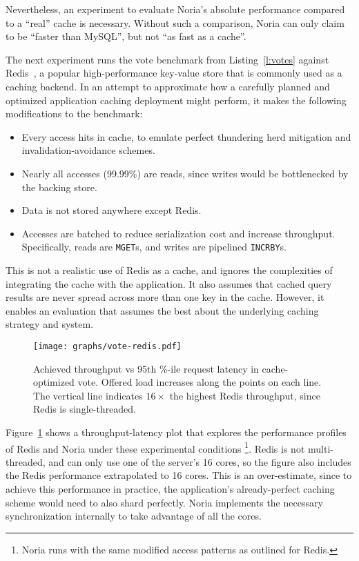 Nevertheless, an experiment to evaluate Noria's absolute performance compared to
a ``real'' cache is necessary. Without such a comparison, Noria can only claim
to be ``faster than MySQL'', but not ``as fast as a cache''.

The next experiment runs the vote benchmark from Listing~\ref{l:votes} against
Redis~\cite{redis}, a popular high-performance key-value store that is commonly
used as a caching backend. In an attempt to approximate how a carefully planned
and optimized application caching deployment might perform, it makes the
following modifications to the benchmark:

\begin{itemize}
 \item Every access hits in cache, to emulate perfect thundering herd mitigation
   and invalidation-avoidance schemes.
 \item Nearly all accesses (99.99\%) are reads, since writes would be
   bottlenecked by the backing store.
 \item Data is not stored anywhere except Redis.
 \item Accesses are batched to reduce serialization cost and increase
   throughput. Specifically, reads are \texttt{MGET}s, and writes are pipelined
    \texttt{INCRBY}s.
\end{itemize}

This is not a realistic use of Redis as a cache, and ignores the complexities of
integrating the cache with the application. It also assumes that cached query
results are never spread across more than one key in the cache. However, it
enables an evaluation that assumes the best about the underlying caching
strategy and system.

\begin{figure}[h]
  \centering
  \texttt{[image: graphs/vote-redis.pdf]}
  \caption{Achieved throughput vs 95th \%-ile request latency in cache-optimized
  vote. Offered load increases along the points on each line. The vertical
  line indicates $16\times$ the highest Redis throughput, since Redis is
  single-threaded.}
  \label{f:vote-redis}
\end{figure}

Figure~\ref{f:vote-redis} shows a throughput-latency plot that explores the
performance profiles of Redis and Noria under these experimental conditions%
\footnote{Noria runs with the same modified access patterns as outlined for
Redis.}.
Redis is not multi-threaded, and can only use one of the server's 16 cores, so
the figure also includes the Redis performance extrapolated to 16 cores. This is
an over-estimate, since to achieve this performance in practice, the
application's already-perfect caching scheme would need to also shard perfectly.
Noria implements the necessary synchronization internally to take advantage of
all the cores.

